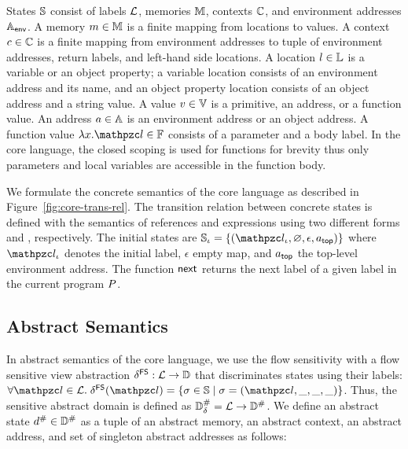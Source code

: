 States $\mathbb{S}$ consist of labels $\mathcal{L}$, memories $\mathbb{M}$, contexts
$\mathbb{C}$, and environment addresses $\mathbb{A}_{\textsf{env}}$.  A memory $m \in \mathbb{M}$
is a finite mapping from locations to values.  A context $c \in \mathbb{C}$ is
a finite mapping from environment addresses to tuple of environment addresses,
return labels, and left-hand side locations.  A location $l \in \mathbb{L}$ is a
variable or an object property; a variable location consists of an environment
address and its name, and an object property location consists of an object
address and a string value.  A value $v \in \mathbb{V}$ is a primitive, an
address, or a function value.  An address $a \in \mathbb{A}$ is an environment
address or an object address.  A function value $\fval{x}{\lab} \in \fvalset$
consists of a parameter and a body label.  In the core language, the closed
scoping is used for functions for brevity thus only parameters and local
variables are accessible in the function body.

We formulate the concrete semantics of the core language as described in
Figure~\ref{fig:core-trans-rel}.  The transition relation between concrete
states is defined with the semantics of references and expressions using two
different forms  and
\fbox{$\exprrule{\st}{\expr}{\val}$}, respectively.  The initial states are
$\istset = \{ (\ilab, \varnothing, \epsilon, \tladdr) \}$ where $\ilab$ denotes
the initial label, $\epsilon$ empty map, and $a_{\textsf{top}}$ the top-level
environment address.  The function $\textsf{next}$ returns the next label of a
given label in the current program $P$.


\subsection{Abstract Semantics}

In abstract semantics of the core language, we use the flow sensitivity with a
flow sensitive view abstraction $\delta^{\textsf{FS}}: \mathcal{L} \rightarrow \mathbb{D}$ that
discriminates states using their labels: $\forall \lab \in \labset. \;
\fsviewmap(\lab) = \{ \st \in \stset \mid \st = (\lab, \_, \_, \_) \}$. Thus, the
sensitive abstract domain is defined as ${\mathbb{D}}^{\#}_\delta = \mathcal{L} \rightarrow
{\mathbb{D}}^{\#}$.  We define an abstract state ${d}^{\#} \in {\mathbb{D}}^{\#}$ as a tuple of an
abstract memory, an abstract context, an abstract address, and set of singleton
abstract addresses as follows:

